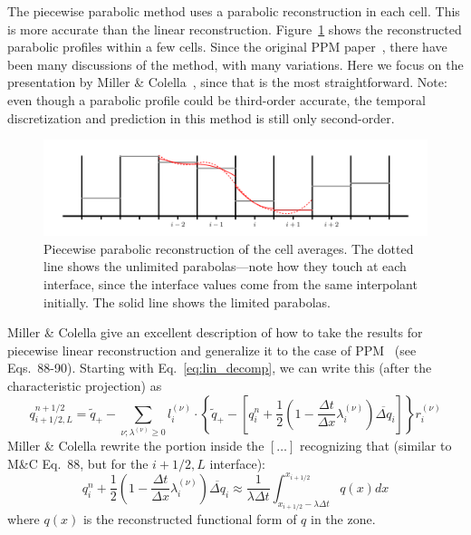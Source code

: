 The piecewise parabolic method uses a parabolic reconstruction in each
cell.  This is more accurate than the linear reconstruction.
Figure~\ref{fig:ppm} shows the reconstructed parabolic profiles within
a few cells.  Since the original PPM
paper~\cite{colellawoodward:1984}, there have been many discussions of
the method, with many variations.  Here we focus on the presentation
by Miller \& Colella~\cite{millercolella:2002}, since that is the most
straightforward.  Note: even though a parabolic profile could be
third-order accurate, the temporal discretization and prediction in
this method is still only second-order.
%
\begin{figure}[t]
\centering
\includegraphics[width=\linewidth]{piecewise-parabolic}
\caption[Piecewise parabolic reconstruction of the cell
  averages.]{\label{fig:ppm} Piecewise parabolic reconstruction of the
  cell averages.  The dotted line shows the unlimited parabolas---note
  how they touch at each interface, since the interface values come
  from the same interpolant initially.  The solid line shows the
  limited parabolas.}
\end{figure}


Miller \& Colella give an excellent description of how to take the
results for piecewise linear reconstruction and generalize it to the case of
PPM~\cite{colellawoodward:1984} (see Eqs.\ 88-90).  Starting with
Eq.~\ref{eq:lin_decomp}, we can write this (after the characteristic
projection) as
\begin{equation}
q_{i+1/2,L}^{n+1/2} = \tilde{q}_+ -
   \sum_{\nu;\lambda^{(\nu)}\ge 0} l_i^{(\nu)} \cdot \left \{
        \tilde{q}_+ - \left [ q_i^n +
            \frac{1}{2} \left ( 1 - \frac{\Delta t}{\Delta x} \lambda_i^{(\nu)} \right ) \overline{\Delta q}_i \right ]
       \right \} r_i^{(\nu)}
\end{equation}
Miller \& Colella rewrite the portion inside the $[\ldots]$
recognizing that (similar to M\&C Eq.\ 88, but for the $i+1/2,L$ interface):
\begin{equation}
  q_i^n + \frac{1}{2} \left (1 - \frac{\Delta t}{\Delta x} \lambda_i^{(\nu)} \right ) \overline{\Delta q}_i 
  \approx \frac{1}{\lambda \Delta t} \int_{x_{i+1/2} - \lambda \Delta t}^{x_{i+1/2}}
           q(x) dx
\end{equation}
where $q(x)$ is the reconstructed functional form of $q$ in the zone.


